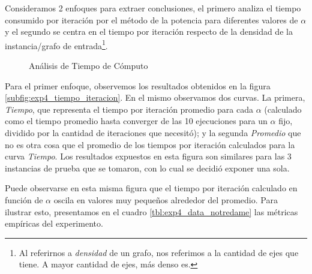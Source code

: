 \par Consideramos 2 enfoques para extraer conclusiones, el primero analiza el
tiempo consumido por iteración por el método de la potencia para diferentes
valores de $\alpha$ y el segundo se centra en el tiempo por iteraci\'on respecto
de la densidad de la instancia/grafo de entrada\footnote{Al referirnos a
\emph{densidad} de un grafo, nos referimos a la cantidad de ejes que tiene. A
mayor cantidad de ejes, m\'as denso es.}.

\begin{figure}[H]
    \centering
    \caption{An\'alisis de Tiempo de C\'omputo} %
\end{figure}

\par Para el primer enfoque, observemos los resultados obtenidos en la figura
\ref{subfig:exp4_tiempo_iteracion}. En el mismo observamos dos curvas. La
primera, \emph{Tiempo}, que representa el tiempo por iteraci\'on promedio para
cada $\alpha$ (calculado como el tiempo promedio hasta converger de las 10
ejecuciones para un $\alpha$ fijo, dividido por la cantidad de iteraciones que
necesit\'o); y la segunda \emph{Promedio} que no es otra cosa que el promedio de
los tiempos por iteraci\'on calculados para la curva \emph{Tiempo}. Los
resultados expuestos en esta figura son similares para las 3 instancias de
prueba que se tomaron, con lo cual se decidi\'o exponer una sola.

\par Puede observarse en esta misma figura que el tiempo por iteraci\'on
calculado en funci\'on de $\alpha$ oscila en valores muy pequeños alrededor del
promedio. Para ilustrar esto, presentamos en el cuadro
\ref{tbl:exp4_data_notredame} las m\'etricas empíricas del experimento.

